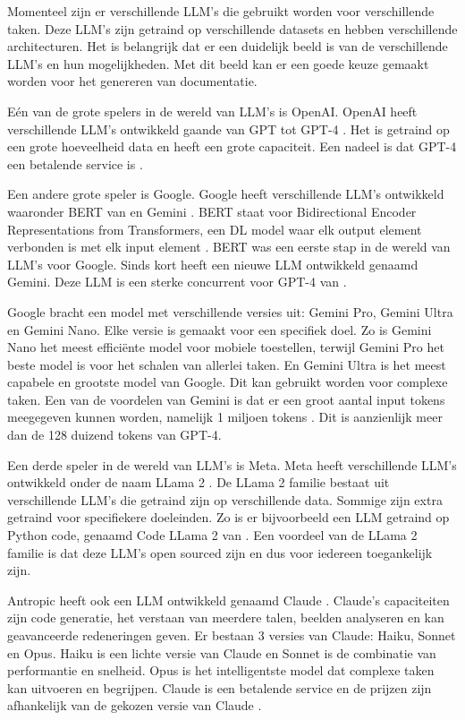 Momenteel zijn er verschillende LLM's die gebruikt worden voor verschillende taken.
Deze LLM's zijn getraind op verschillende datasets en hebben verschillende architecturen.
Het is belangrijk dat er een duidelijk beeld is van de verschillende LLM's en hun mogelijkheden. 
Met dit beeld kan er een goede keuze gemaakt worden voor het genereren van documentatie.

Eén van de grote spelers in de wereld van LLM's is OpenAI. OpenAI heeft verschillende LLM's ontwikkeld gaande van GPT \autocite{RandfordEtAL2018} tot GPT-4 \autocite{OpenAI2023}.
Het is getraind op een grote hoeveelheid data en heeft een grote capaciteit.
Een nadeel is dat GPT-4 een betalende service is \autocite{OpenAI2023}.

Een andere grote speler is Google. Google heeft verschillende LLM's ontwikkeld waaronder BERT van \textcite{DevlinEtAl2019} en Gemini \autocite{Google2024}.
BERT staat voor Bidirectional Encoder Representations from Transformers, een DL model waar elk output element verbonden is met elk input element \autocite{HashemiPour2024}.
BERT was een eerste stap in de wereld van LLM's voor Google. Sinds kort heeft \textcite{Google2024} een nieuwe LLM ontwikkeld genaamd Gemini.
Deze LLM is een sterke concurrent voor GPT-4 van \textcite{OpenAI2023}. 

Google \autocite{Google2024} bracht een model met verschillende versies uit: Gemini Pro, Gemini Ultra en Gemini Nano. 
Elke versie is gemaakt voor een specifiek doel. Zo is Gemini Nano het meest efficiënte model voor mobiele toestellen, terwijl Gemini Pro het beste model is voor het schalen van allerlei taken.
En Gemini Ultra is het meest capabele en grootste model van Google. Dit kan gebruikt worden voor complexe taken.
Een van de voordelen van Gemini is dat er een groot aantal input tokens meegegeven kunnen worden, namelijk 1 miljoen tokens \autocite{Google2024}.
Dit is aanzienlijk meer dan de 128 duizend tokens van GPT-4.

Een derde speler in de wereld van LLM's is Meta. Meta heeft verschillende LLM's ontwikkeld onder de naam LLama 2 \autocite{Meta2024}.
De LLama 2 familie bestaat uit verschillende LLM's die getraind zijn op verschillende data. Sommige zijn extra getraind voor specifiekere doeleinden.
Zo is er bijvoorbeeld een LLM getraind op Python code, genaamd Code LLama 2 van \textcite{Roziere2024}.
Een voordeel van de LLama 2 familie is dat deze LLM's open sourced zijn en dus voor iedereen toegankelijk zijn.

Antropic heeft ook een LLM ontwikkeld genaamd Claude \autocite{Anthropic2023}. 
Claude's capaciteiten zijn code generatie, het verstaan van meerdere talen, beelden analyseren en kan geavanceerde redeneringen geven.
Er bestaan 3 versies van Claude: Haiku, Sonnet en Opus.
Haiku is een lichte versie van Claude en Sonnet is de combinatie van performantie en snelheid. Opus is het intelligentste model dat complexe taken kan uitvoeren en begrijpen.
Claude is een betalende service en de prijzen zijn afhankelijk van de gekozen versie van Claude \autocite{Anthropic2023}.

